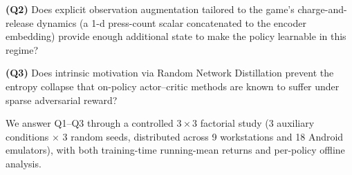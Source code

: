 \documentclass{article}
\begin{document}
\textbf{(Q2)} Does explicit observation augmentation tailored to
the game's charge-and-release dynamics (a 1-d press-count scalar
concatenated to the encoder embedding) provide enough additional
state to make the policy learnable in this regime?

\textbf{(Q3)} Does intrinsic motivation via Random Network
Distillation \cite{burda2018rnd} prevent the entropy collapse that
on-policy actor--critic methods are known to suffer
\cite{pathak2017curiosity,lyle2022what} under sparse adversarial
reward?

We answer Q1--Q3 through a controlled $3\times3$ factorial study
(3 auxiliary conditions $\times$ 3 random seeds, distributed across
9 workstations and 18 Android emulators), with both training-time
running-mean returns and per-policy offline analysis.
\end{document}
